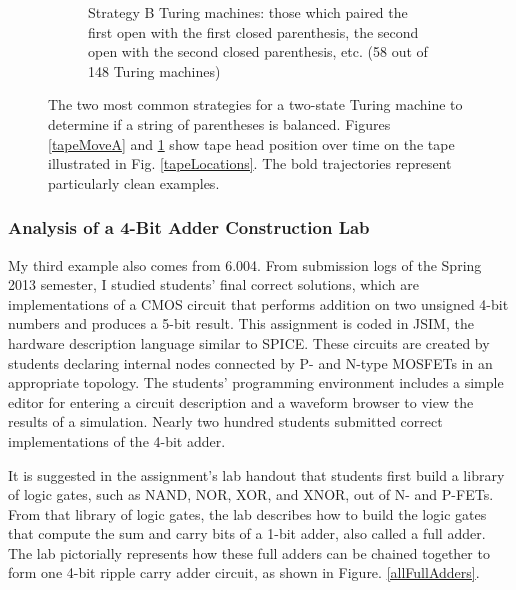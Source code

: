 \documentclass[12pt]{article}
\begin{document}
\begin{figure}[p]
\begin{subfigure}[b]{1.0\textwidth}
\caption{Strategy B Turing machines: those which paired the first open with the first closed parenthesis, the second open with the second closed parenthesis, etc. (58 out of 148 Turing machines)}
\label{tapeMoveB}
\end{subfigure}
\caption{The two most common strategies for a two-state Turing machine to determine if a string of parentheses is balanced. Figures \ref{tapeMoveA} and \ref{tapeMoveB} show tape head position over time on the tape illustrated in Fig. \ref{tapeLocations}. The bold trajectories represent particularly clean examples.}
\label{turingFig}
\end{figure}

\subsubsection{Analysis of a 4-Bit Adder Construction Lab}

My third example also comes from 6.004. From submission logs of the Spring 2013 semester, I studied students’ final correct solutions, which are implementations of a CMOS circuit that performs addition on two unsigned 4-bit numbers and produces a 5-bit result. This assignment is coded in JSIM, the hardware description language similar to SPICE. These circuits are created by students declaring internal nodes connected by P- and N-type MOSFETs in an appropriate topology. The students’ programming environment includes a simple editor for entering a circuit description and a waveform browser to view the results of a simulation. Nearly two hundred students submitted correct implementations of the 4-bit adder. 

It is suggested in the assignment’s lab handout that students first build a library of logic gates, such as NAND, NOR, XOR, and XNOR, out of N- and P-FETs. From that library of logic gates, the lab describes how to build the logic gates that compute the sum and carry bits of a 1-bit adder, also called a full adder. The lab pictorially represents how these full adders can be chained together to form one 4-bit ripple carry adder circuit, as shown in Figure. \ref{allFullAdders}.
\end{document}
